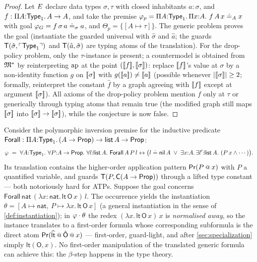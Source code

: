 \begin{proof}
Let $E$ declare data types $\sigma, \tau$ with closed inhabitants
$a : \sigma$, and $f : \Pi A{:}\mathsf{Type}_1.\,A \to A$, and take the
premise $\varphi_p = \Pi A{:}\mathsf{Type}_1.\,\Pi x{:}A.\ f\,A\,x \doteq_A
x$ with goal $\varphi_G = f\,\sigma\,a \doteq_\sigma a$, and
$\Theta_p = \{[A \mapsto \tau]\}$.  The generic problem proves the
goal (instantiate the guarded universal with $\hat\sigma$ and
$\hat{a}$; the guards $\mathsf{T}(\hat\sigma, \ulcorner \mathsf{Type}_1 \urcorner)$ and
$\mathsf{T}(\hat{a}, \hat\sigma)$ are typing atoms of the
translation).  For the drop-policy problem, only the
$\tau$-instance is present; a countermodel is obtained from
$\mathfrak{M}^{*}$ by reinterpreting $\mathrm{ap}$ at the point
$([\![ f ]\!], [\![ \sigma ]\!])$: replace $[\![ f ]\!]$'s value at $\sigma$
by a non-identity function $g$ on $[\![ \sigma ]\!]$ with $g([\![ a ]\!])
\neq [\![ a ]\!]$ (possible whenever $|[\![ \sigma ]\!]| \geq 2$; formally,
reinterpret the constant $\hat{f}$ by a graph agreeing with
$[\![ f ]\!]$ except at argument $[\![ \sigma ]\!]$).  All axioms of the
drop-policy problem mention $f$ only at $\tau$ or generically
through typing atoms that remain true (the modified graph still
maps $[\![ \sigma ]\!]$ into $[\![ \sigma ]\!] \to [\![ \sigma ]\!]$), while
the conjecture is now false.
\end{proof}

\begin{example}
\label{ex:mono-beta}
Consider the polymorphic inversion premise for the inductive
predicate $\mathsf{Forall} : \Pi A{:}\mathsf{Type}_1.\,(A \to \mathsf{Prop}) \to
\mathsf{list}\,A \to \mathsf{Prop}$:
\[
  \varphi \;=\; \forall A{:}\mathsf{Type}_1.\ \forall P{:}A \to \mathsf{Prop}.\
  \forall l{:}\mathsf{list}\,A.\
  \mathsf{Forall}\,A\,P\,l \leftrightarrow
  \bigl( l \doteq \mathsf{nil}\,A \;\vee\; \exists x{:}A.\,
  \exists l'{:}\mathsf{list}\,A.\,\, (P\,x \wedge \cdots) \bigr).
\]
Its translation contains the higher-order application pattern
$\PR(P \app x)$ with $P$ a quantified variable, and guards
$\mathsf{T}(P, \mathsf{C}(A \to \mathsf{Prop}))$ through a lifted type constant
--- both notoriously hard for ATPs.  Suppose the goal concerns
$\mathsf{Forall}\,\mathsf{nat}\,(\lambda x{:}\mathsf{nat}.\,
\mathsf{lt}\,\mathsf{O}\,x)\,l$.  The occurrence yields the
instantiation $\theta = [A \mapsto \mathsf{nat},\ P \mapsto \lambda
x.\,\mathsf{lt}\,\mathsf{O}\,x]$ (a general instantiation in the
sense of \cref{def:instantiation}); in
$\varphi \cdot \theta$ the redex $(\lambda
x.\,\mathsf{lt}\,\mathsf{O}\,x)\,x$ is \emph{normalised away}, so
the instance translates to a first-order formula whose corresponding
subformula is the direct atom
$\PR(\widehat{\mathsf{lt}} \app \hat{\mathsf{O}} \app x)$ ---
first-order, guard-light, and after
\cref{sec:specialization} simply $\mathsf{lt}(\mathsf{O}, x)$.  No
first-order manipulation of the translated generic formula can
achieve this: the $\beta$-step happens in the type theory.
\end{example}

